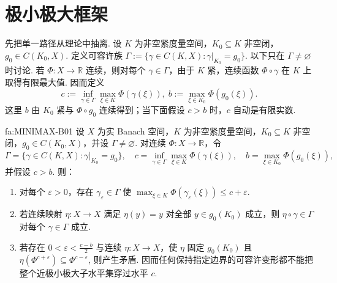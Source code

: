 \section{极小极大框架}\label{sec:iii10-minimax-framework}

先把单一路径从理论中抽离. 设 \(\displaystyle K\) 为非空紧度量空间，\(\displaystyle K_0\subseteq K\) 非空闭，\(\displaystyle g_0\in C(K_0,X)\). 定义可容许族
\(\displaystyle \Gamma := \{\gamma\in C(K,X):\gamma|_{K_0}=g_0\}\).
以下只在 \(\displaystyle\Gamma\neq\varnothing\) 时讨论. 若 \(\displaystyle\Phi:X\to\mathbb R\) 连续，则对每个 \(\displaystyle\gamma\in\Gamma\)，由于 \(\displaystyle K\) 紧，连续函数 \(\displaystyle\Phi\circ\gamma\) 在 \(\displaystyle K\) 上取得有限最大值. 因而定义
\[
c
:=
\inf_{\gamma\in\Gamma}\max_{\xi\in K}\Phi(\gamma(\xi)),
\;
b
:=
\max_{\xi\in K_0}\Phi(g_0(\xi)).
\]
这里 \(\displaystyle b\) 由 \(\displaystyle K_0\) 紧与 \(\displaystyle\Phi\circ g_0\) 连续得到；当下面假设 \(\displaystyle c>b\) 时，\(\displaystyle c\) 自动是有限实数.

\begin{FATheorem}[B][一般极小极大变形框架]{fa:MINIMAX-B01}
设 \(\displaystyle X\) 为实 Banach 空间，\(\displaystyle K\) 为非空紧度量空间，\(\displaystyle K_0\subseteq K\) 非空闭，\(\displaystyle g_0\in C(K_0,X)\)，并设 \(\displaystyle\Gamma\neq\varnothing\). 对连续 \(\displaystyle\Phi:X\to\mathbb R\)，令
\[
\Gamma=\{\gamma\in C(K,X):\gamma|_{K_0}=g_0\},
\quad
c=\inf_{\gamma\in\Gamma}\max_{\xi\in K}\Phi(\gamma(\xi)),
\quad
b=\max_{\xi\in K_0}\Phi(g_0(\xi)),
\]
并假设 \(\displaystyle c>b\). 则：
\begin{enumerate}
\item 对每个 \(\displaystyle\varepsilon>0\)，存在 \(\displaystyle\gamma_\varepsilon\in\Gamma\) 使
\(\displaystyle \max_{\xi\in K}\Phi(\gamma_\varepsilon(\xi)) \leqslant c+\varepsilon\).
\item 若连续映射 \(\displaystyle\eta:X\to X\) 满足 \(\displaystyle\eta(y)=y\) 对全部 \(\displaystyle y\in g_0(K_0)\) 成立，则 \(\displaystyle\eta\circ\gamma\in\Gamma\) 对每个 \(\displaystyle\gamma\in\Gamma\) 成立.
\item 若存在 \(\displaystyle0<\varepsilon<\frac{c-b}{2}\) 与连续 \(\displaystyle\eta:X\to X\)，使 \(\displaystyle\eta\) 固定 \(\displaystyle g_0(K_0)\) 且
\(\displaystyle \eta(\Phi^{c+\varepsilon}) \subseteq \Phi^{c-\varepsilon}\),
则产生矛盾. 因而任何保持指定边界的可容许变形都不能把整个近极小极大子水平集穿过水平 \(\displaystyle c\).
\end{enumerate}
\end{FATheorem}

